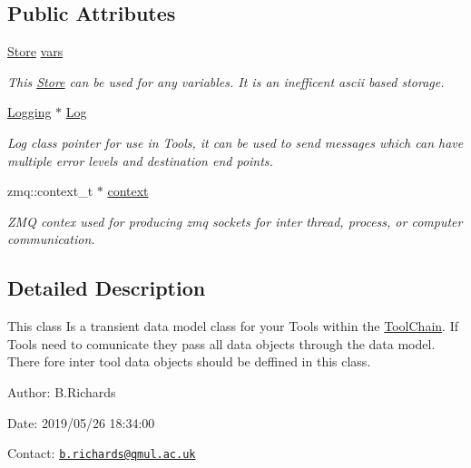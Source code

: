 \subsection*{Public Attributes}
\begin{DoxyCompactItemize}
\item 
\hyperlink{classStore}{Store} \hyperlink{classDataModel_a4baac5fe364a7a23762d70d2c2216486}{vars}
\begin{DoxyCompactList}\small\item\em This \hyperlink{classStore}{Store} can be used for any variables. It is an inefficent ascii based storage. \end{DoxyCompactList}\item 
\hyperlink{classLogging}{Logging} $\ast$ \hyperlink{classDataModel_a3cb335c70a8fe3f4852dbd96844f9417}{Log}
\begin{DoxyCompactList}\small\item\em Log class pointer for use in Tools, it can be used to send messages which can have multiple error levels and destination end points. \end{DoxyCompactList}\item 
\hypertarget{classDataModel_aff20e7d5015b744d4efc9398f6902f8f}{zmq\-::context\-\_\-t $\ast$ \hyperlink{classDataModel_aff20e7d5015b744d4efc9398f6902f8f}{context}}\label{classDataModel_aff20e7d5015b744d4efc9398f6902f8f}

\begin{DoxyCompactList}\small\item\em Z\-M\-Q contex used for producing zmq sockets for inter thread, process, or computer communication. \end{DoxyCompactList}\end{DoxyCompactItemize}


\subsection{Detailed Description}
This class Is a transient data model class for your Tools within the \hyperlink{classToolChain}{Tool\-Chain}. If Tools need to comunicate they pass all data objects through the data model. There fore inter tool data objects should be deffined in this class.

\begin{DoxyParagraph}{Author\-:}
B.\-Richards 
\end{DoxyParagraph}
\begin{DoxyParagraph}{Date\-:}
2019/05/26 18\-:34\-:00 
\end{DoxyParagraph}
Contact\-: \href{mailto:b.richards@qmul.ac.uk}{\tt b.\-richards@qmul.\-ac.\-uk} 

